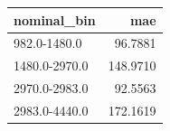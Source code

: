 \begin{tabular}{lr}
\toprule
nominal_bin & mae \\
\midrule
982.0-1480.0 & 96.7881 \\
1480.0-2970.0 & 148.9710 \\
2970.0-2983.0 & 92.5563 \\
2983.0-4440.0 & 172.1619 \\
\bottomrule
\end{tabular}
